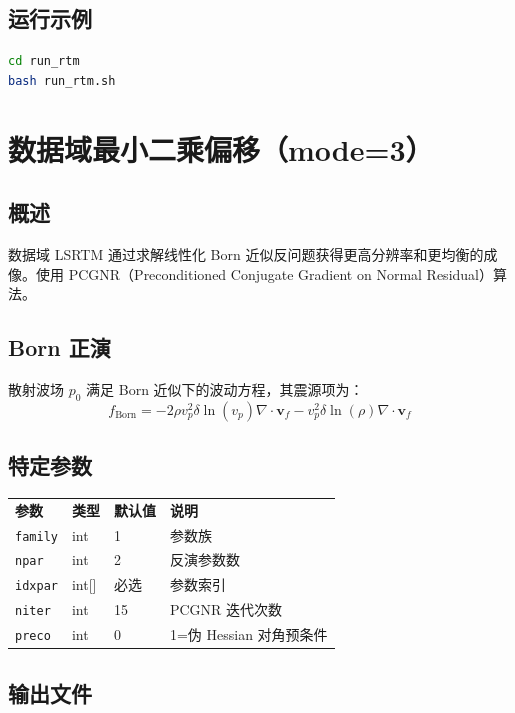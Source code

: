 \documentclass[11pt,a4paper]{ctexart}
\begin{document}
\subsection{运行示例}

\begin{lstlisting}[language=bash]
cd run_rtm
bash run_rtm.sh
\end{lstlisting}

\section{数据域最小二乘偏移（mode=3）}

\subsection{概述}

数据域 LSRTM 通过求解线性化 Born 近似反问题获得更高分辨率和更均衡的成像。使用 PCGNR（Preconditioned Conjugate Gradient on Normal Residual）算法。

\subsection{Born 正演}

散射波场 $p_0$ 满足 Born 近似下的波动方程，其震源项为：
\[
f_{\text{Born}} = -2\rho v_p^2 \delta\ln(v_p) \nabla \cdot \mathbf{v}_f
- v_p^2 \delta\ln(\rho) \nabla \cdot \mathbf{v}_f
\]

\subsection{特定参数}

\begin{tabular}{lllp{5cm}}
\textbf{参数} & \textbf{类型} & \textbf{默认值} & \textbf{说明} \\
\texttt{family} & int & 1 & 参数族 \\
\texttt{npar}   & int & 2 & 反演参数数 \\
\texttt{idxpar} & int[] & 必选 & 参数索引 \\
\texttt{niter}  & int & 15 & PCGNR 迭代次数 \\
\texttt{preco}  & int & 0  & 1=伪 Hessian 对角预条件 \\
\end{tabular}

\subsection{输出文件}
\end{document}
